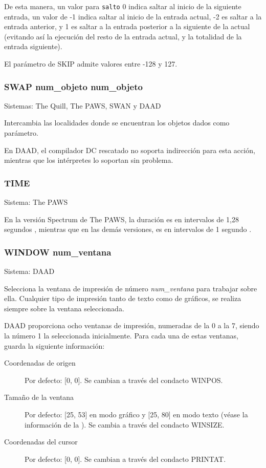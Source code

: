 \documentclass[11pt, a5paper]{article}
\newcommand{\quill}{\textsf{The Quill}\xspace}
\newcommand{\paw}{\textsf{The PAWS}\xspace}
\newcommand{\swan}{\textsf{SWAN}\xspace}
\newcommand{\daad}{\textsf{DAAD}\xspace}
\newcommand{\sistema}[1]{\noindent Sistema: #1 \nopagebreak}
\newcommand{\sistemas}[1]{\noindent Sistemas: #1 \nopagebreak}
\begin{document}
De esta manera, un valor para \texttt{salto} 0 indica saltar al inicio de la siguiente entrada, un valor de -1 indica saltar al inicio de la entrada actual, -2 es saltar a la entrada anterior, y 1 es saltar a la entrada posterior a la siguiente de la actual (evitando así la ejecución del resto de la entrada actual, y la totalidad de la entrada siguiente).

El parámetro de SKIP admite valores entre -128 y 127.

\subsubsection{SWAP num\_objeto num\_objeto}

\sistemas{\quill, \paw, \swan y \daad}

Intercambia las localidades donde se encuentran los objetos dados como parámetro.

En \daad, el compilador DC rescatado no soporta indirección para esta acción, mientras que los intérpretes lo soportan sin problema.

\subsubsection{TIME}

\sistema{\paw}

En la versión Spectrum de \paw, la duración es en intervalos de 1,28 segundos \cite{PawsZX}, mientras que en las demás versiones, es en intervalos de 1 segundo \cite{PawsPC}.

\subsubsection{WINDOW num\_ventana}

\sistema{\daad}

Selecciona la ventana de impresión de número \emph{num\_ventana} para trabajar sobre ella. Cualquier tipo de impresión tanto de texto como de gráficos, se realiza siempre sobre la ventana seleccionada.

\daad proporciona ocho ventanas de impresión, numeradas de la 0 a la 7, siendo la número 1 la seleccionada inicialmente. Para cada una de estas ventanas, guarda la siguiente información:

\begin{description}
  \item[Coordenadas de origen] Por defecto: [0, 0]. Se cambian a través del condacto WINPOS.

  \item[Tamaño de la ventana] Por defecto: [25, 53] en modo gráfico y [25, 80] en modo texto (véase la información de la \textbf{}). Se cambia a través del condacto WINSIZE.

  \item[Coordenadas del cursor] Por defecto: [0, 0]. Se cambian a través del condacto PRINTAT.
\end{description}
\end{document}
